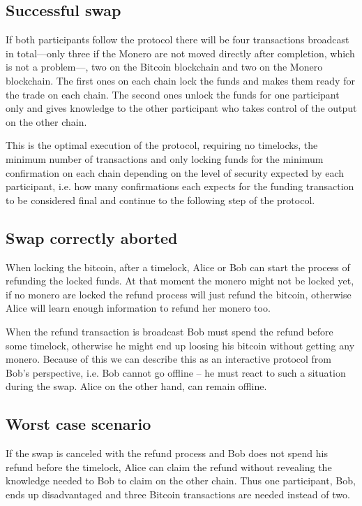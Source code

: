 \documentclass{llncs}
\begin{document}
\subsection{Successful swap}
If both participants follow the protocol there will be four transactions broadcast in total---only three if the Monero are not moved directly after completion, which is not a problem---, two on the Bitcoin blockchain and two on the Monero blockchain. The first ones on each chain lock the funds and makes them ready for the trade on each chain. The second ones unlock the funds for one participant only and gives knowledge to the other participant who takes control of the output on the other chain.

This is the optimal execution of the protocol, requiring no timelocks, the minimum number of transactions and only locking funds for the minimum confirmation on each chain depending on the level of security expected by each participant, i.e. how many confirmations each expects for the funding transaction to be considered final and continue to the following step of the protocol.

\subsection{Swap correctly aborted}
When locking the bitcoin, after a timelock, Alice or Bob can start the process of refunding the locked funds. At that moment the monero might not be locked yet, if no monero are locked the refund process will just refund the bitcoin, otherwise Alice will learn enough information to refund her monero too.

When the refund transaction is broadcast Bob must spend the refund before some timelock, otherwise he might end up loosing his bitcoin without getting any monero.  Because of this we can describe this as an interactive protocol from Bob's perspective, i.e. Bob cannot go offline -- he must react to such a situation during the swap. Alice on the other hand, can remain offline.

\subsection{Worst case scenario}
If the swap is canceled with the refund process and Bob does not spend his refund before the timelock, Alice can claim the refund without revealing the knowledge needed to Bob to claim on the other chain. Thus one participant, Bob, ends up disadvantaged and three Bitcoin transactions are needed instead of two.
\end{document}
